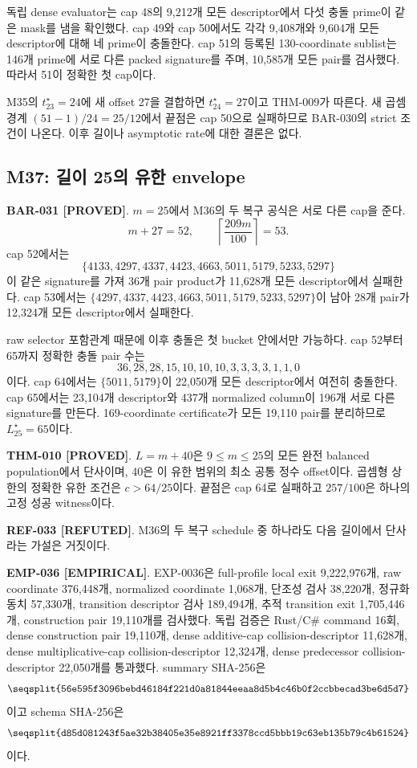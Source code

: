 \documentclass[11pt]{article}
\newcommand{\claimstatus}[2]{\textbf{#1 [#2]}}
\begin{document}
독립 dense evaluator는 cap 48의 9,212개 모든 descriptor에서 다섯
충돌 prime이 같은 mask를 냄을 확인했다. cap 49와 cap 50에서도 각각
9,408개와 9,604개 모든 descriptor에 대해 네 prime이 충돌한다.
cap 51의 등록된 130-coordinate sublist는 146개 prime에 서로 다른
packed signature를 주며, 10,585개 모든 pair를 검사했다. 따라서
51이 정확한 첫 cap이다.

M35의 \(t_{23}^\star=24\)에 새 offset 27을 결합하면
\(t_{24}^\star=27\)이고 THM-009가 따른다. 새 곱셈 경계
\((51-1)/24=25/12\)에서 끝점은 cap 50으로 실패하므로 BAR-030의
strict 조건이 나온다. 이후 길이나 asymptotic rate에 대한 결론은
없다.

\subsection{M37: 길이 25의 유한 envelope}

\claimstatus{BAR-031}{PROVED}.
\(m=25\)에서 M36의 두 복구 공식은 서로 다른 cap을 준다.
\[
m+27=52,\qquad
\left\lceil\frac{209m}{100}\right\rceil=53.
\]
cap 52에서는
\[
\{4133,4297,4337,4423,4663,5011,5179,5233,5297\}
\]
이 같은 signature를 가져 36개 pair product가 11,628개 모든
descriptor에서 실패한다. cap 53에서는
\(\{4297,4337,4423,4663,5011,5179,5233,5297\}\)이 남아 28개 pair가
12,324개 모든 descriptor에서 실패한다.

raw selector 포함관계 때문에 이후 충돌은 첫 bucket 안에서만
가능하다. cap 52부터 65까지 정확한 충돌 pair 수는
\[
36,28,28,15,10,10,10,3,3,3,3,1,1,0
\]
이다. cap 64에서는 \(\{5011,5179\}\)이 22,050개 모든 descriptor에서
여전히 충돌한다. cap 65에서는 23,104개 descriptor와 437개 normalized
column이 196개 서로 다른 signature를 만든다.
169-coordinate certificate가 모든 19,110 pair를
분리하므로 \(L_{25}^\star=65\)이다.

\claimstatus{THM-010}{PROVED}.
\(L=m+40\)은 \(9\le m\le25\)의 모든 완전 balanced population에서
단사이며, 40은 이 유한 범위의 최소 공통 정수 offset이다. 곱셈형
상한의 정확한 유한 조건은 \(c>64/25\)이다. 끝점은 cap 64로
실패하고 \(257/100\)은 하나의 고정 성공 witness이다.

\claimstatus{REF-033}{REFUTED}.
M36의 두 복구 schedule 중 하나라도 다음 길이에서 단사라는 가설은
거짓이다.

\claimstatus{EMP-036}{EMPIRICAL}.
EXP-0036은 full-profile local exit 9,222,976개, raw coordinate
376,448개, normalized coordinate 1,068개, 단조성 검사 38,220개,
정규화 동치 57,330개, transition descriptor 검사 189,494개,
추적 transition exit 1,705,446개, construction pair 19,110개를
검사했다. 독립 검증은 Rust/C\# command 16회, dense construction pair
19,110개, dense additive-cap collision-descriptor 11,628개, dense
multiplicative-cap collision-descriptor 12,324개, dense predecessor
collision-descriptor 22,050개를 통과했다. summary SHA-256은
\[
\texttt{\seqsplit{56e595f3096bebd46184f221d0a81844eeaa8d5b4c46b0f2ccbbecad3be6d5d7}}
\]
이고 schema SHA-256은
\[
\texttt{\seqsplit{d85d081243f5ae32b38405e35e8921ff3378ccd5bbb19c63eb135b79c4b61524}}
\]
이다.
\end{document}
